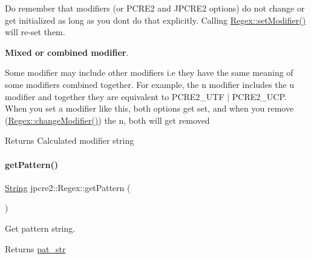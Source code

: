 Do remember that modifiers (or P\+C\+R\+E2 and J\+P\+C\+R\+E2 options) do not change or get initialized as long as you don\textquotesingle{}t do that explicitly. Calling \hyperlink{classjpcre2_1_1Regex_aed9865b58c60945e19f36fa310f5a595_aed9865b58c60945e19f36fa310f5a595}{Regex\+::set\+Modifier()} will re-\/set them.

{\bfseries Mixed or combined modifier}.

Some modifier may include other modifiers i.\+e they have the same meaning of some modifiers combined together. For example, the \textquotesingle{}n\textquotesingle{} modifier includes the \textquotesingle{}u\textquotesingle{} modifier and together they are equivalent to {\ttfamily P\+C\+R\+E2\+\_\+\+U\+TF $\vert$ P\+C\+R\+E2\+\_\+\+U\+CP}. When you set a modifier like this, both options get set, and when you remove ({\ttfamily \hyperlink{classjpcre2_1_1Regex_a9ab3efed9819a51225456e6d8487de56_a9ab3efed9819a51225456e6d8487de56}{Regex\+::change\+Modifier()})} the \textquotesingle{}n\textquotesingle{}, both will get removed \begin{DoxyReturn}{Returns}
Calculated modifier string 
\end{DoxyReturn}
\hypertarget{classjpcre2_1_1Regex_a006dd17f71a2d717aa9575d72fac6d7b_a006dd17f71a2d717aa9575d72fac6d7b}{}\label{classjpcre2_1_1Regex_a006dd17f71a2d717aa9575d72fac6d7b_a006dd17f71a2d717aa9575d72fac6d7b} 
\paragraph{\texorpdfstring{get\+Pattern()}{getPattern()}}
{\footnotesize\ttfamily \hyperlink{namespacejpcre2_a91f03070152fb228bc116c5a737f1d16}{String} jpcre2\+::\+Regex\+::get\+Pattern (\begin{DoxyParamCaption}{ }\end{DoxyParamCaption})\hspace{0.3cm}{\ttfamily [inline]}}



Get pattern string. 

\begin{DoxyReturn}{Returns}
\hyperlink{classjpcre2_1_1Regex_a0bceb85b6dbba355b56b5cc312214435}{pat\+\_\+str} 
\end{DoxyReturn}
\hypertarget{classjpcre2_1_1Regex_a857307fc59ba7f010b097e61c1744923_a857307fc59ba7f010b097e61c1744923}{}\label{classjpcre2_1_1Regex_a857307fc59ba7f010b097e61c1744923_a857307fc59ba7f010b097e61c1744923} 
